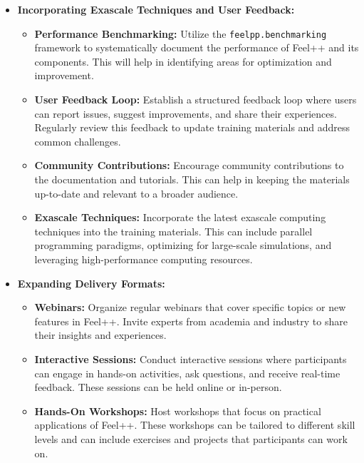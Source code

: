\begin{itemize}
    \item \textbf{Incorporating Exascale Techniques and User Feedback:}
    \begin{itemize}
        \item \textbf{Performance Benchmarking:} Utilize the \texttt{feelpp.benchmarking} framework to systematically document the performance of Feel++ and its components. This will help in identifying areas for optimization and improvement.
        \item \textbf{User Feedback Loop:} Establish a structured feedback loop where users can report issues, suggest improvements, and share their experiences. Regularly review this feedback to update training materials and address common challenges.
        \item \textbf{Community Contributions:} Encourage community contributions to the documentation and tutorials. This can help in keeping the materials up-to-date and relevant to a broader audience.
        \item \textbf{Exascale Techniques:} Incorporate the latest exascale computing techniques into the training materials. This can include parallel programming paradigms, optimizing for large-scale simulations, and leveraging high-performance computing resources.
    \end{itemize}

    \item \textbf{Expanding Delivery Formats:}
    \begin{itemize}
        \item \textbf{Webinars:} Organize regular webinars that cover specific topics or new features in Feel++. Invite experts from academia and industry to share their insights and experiences.
        \item \textbf{Interactive Sessions:} Conduct interactive sessions where participants can engage in hands-on activities, ask questions, and receive real-time feedback. These sessions can be held online or in-person.
        \item \textbf{Hands-On Workshops:} Host workshops that focus on practical applications of Feel++. These workshops can be tailored to different skill levels and can include exercises and projects that participants can work on.
    \end{itemize}


\end{itemize}
